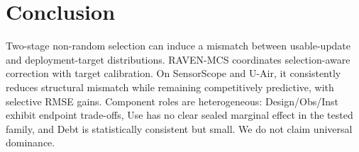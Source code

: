 \section{Conclusion}
Two-stage non-random selection can induce a mismatch between usable-update and deployment-target distributions. RAVEN-MCS coordinates selection-aware correction with target calibration. On SensorScope and U-Air, it consistently reduces structural mismatch while remaining competitively predictive, with selective RMSE gains. Component roles are heterogeneous: Design/Obs/Inst exhibit endpoint trade-offs, Use has no clear sealed marginal effect in the tested family, and Debt is statistically consistent but small. We do not claim universal dominance.
